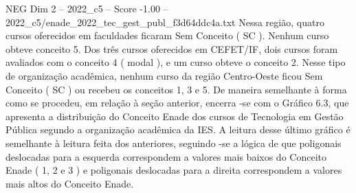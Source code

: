 \begin{textsample}{NEG Dim 2 – 2022\_c5 – Score -1.00 – 2022\_c5/enade\_2022\_tec\_gest\_publ\_f3d64ddc4a.txt}
Nessa região, quatro cursos oferecidos em faculdades ficaram Sem Conceito ( SC ).
Nenhum curso obteve conceito 5.
Dos três cursos oferecidos em CEFET/IF, dois cursos foram avaliados com o conceito 4 ( modal ), e um curso obteve o conceito 2.
Nesse tipo de organização acadêmica, nenhum curso da região Centro-Oeste ficou Sem Conceito ( SC ) ou recebeu os conceitos 1, 3 e 5.
De maneira semelhante à forma como se procedeu, em relação à seção anterior, encerra -se com o Gráfico 6.3, que apresenta a distribuição do Conceito Enade dos cursos de Tecnologia em Gestão Pública segundo a organização acadêmica da IES.
A leitura desse último gráfico é semelhante à leitura feita dos anteriores, seguindo -se a lógica de que poligonais deslocadas para a esquerda correspondem a valores mais baixos do Conceito Enade ( 1, 2 e 3 ) e poligonais deslocadas para a direita correspondem a valores mais altos do Conceito Enade.

\end{textsample}
